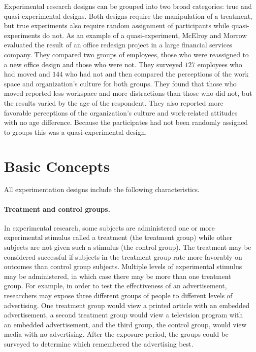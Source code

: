 Experimental research designs can be grouped into two broad categories: true and quasi-experimental designs. Both designs require the manipulation of a treatment, but true experiments also require random assignment of participants while quasi-experiments do not. As an example of a quasi-experiment, McElroy and Morrow\cite{mcelroy2010employee} evaluated the result of an office redesign project in a large financial services company. They compared two groups of employees, those who were reassigned to a new office design and those who were not. They surveyed $ 127 $ employees who had moved and $ 144 $ who had not and then compared the perceptions of the work space and organization's culture for both groups. They found that those who moved reported less workspace and more distractions than those who did not, but the results varied by the age of the respondent. They also reported more favorable perceptions of the organization's culture and work-related attitudes with no age difference. Because the participates had not been randomly assigned to groups this was a quasi-experimental design.

\section{Basic Concepts}

All experimentation designs include the following characteristics.

\paragraph{Treatment and control groups.} In experimental research, some subjects are administered one or more experimental stimulus called a treatment (the treatment group) while other subjects are not given such a stimulus (the control group). The treatment may be considered successful if subjects in the treatment group rate more favorably on outcomes than control group subjects. Multiple levels of experimental stimulus may be administered, in which case there may be more than one treatment group. For example, in order to test the effectiveness of an advertisement, researchers may expose three different groups of people to different levels of advertising. One treatment group would view a printed article with an embedded advertisement, a second treatment group would view a television program with an embedded advertisement, and the third group, the control group, would view media with no advertising. After the exposure period, the groups could be surveyed to determine which remembered the advertising best.

